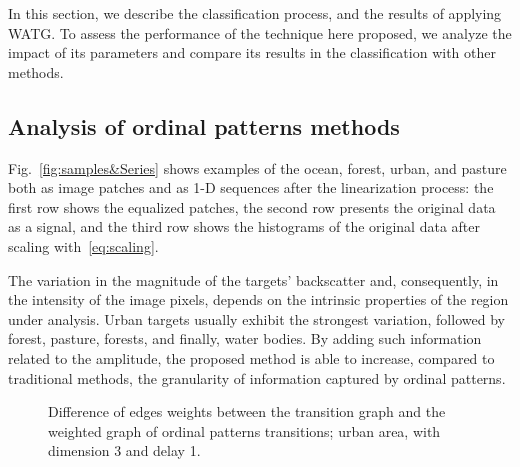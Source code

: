 \documentclass[journal]{IEEEtran}
\begin{document}
In this section, we describe  the classification process, and 
the results of applying WATG.
To assess the performance of the technique here proposed, we analyze the impact of its parameters and compare its results in the classification with other methods.

\subsection{Analysis of ordinal patterns methods}

Fig.~\ref{fig:samples&Series} shows examples of the ocean, forest, urban, and pasture both as image patches and as 1-D sequences after the linearization process:
the first row shows the equalized patches,
the second row presents the original data as a signal,
and the third row shows the histograms of the original data after scaling with~\eqref{eq:scaling}.

The variation in the magnitude of the targets' backscatter and, consequently, in the intensity of the image pixels, depends on the intrinsic properties of the region under analysis.
Urban targets usually exhibit the strongest variation, followed by forest, pasture, forests, and finally, water bodies.
By adding such information related to the amplitude, the proposed method is able to increase, compared to traditional methods, the granularity of information captured by ordinal patterns.

\begin{figure}%
	\centering
	\caption{Difference of edges weights between the transition graph and the weighted graph of ordinal patterns transitions; urban area, with dimension 3 and delay 1.}
	\label{fig:graphs}
\end{figure}
\end{document}
